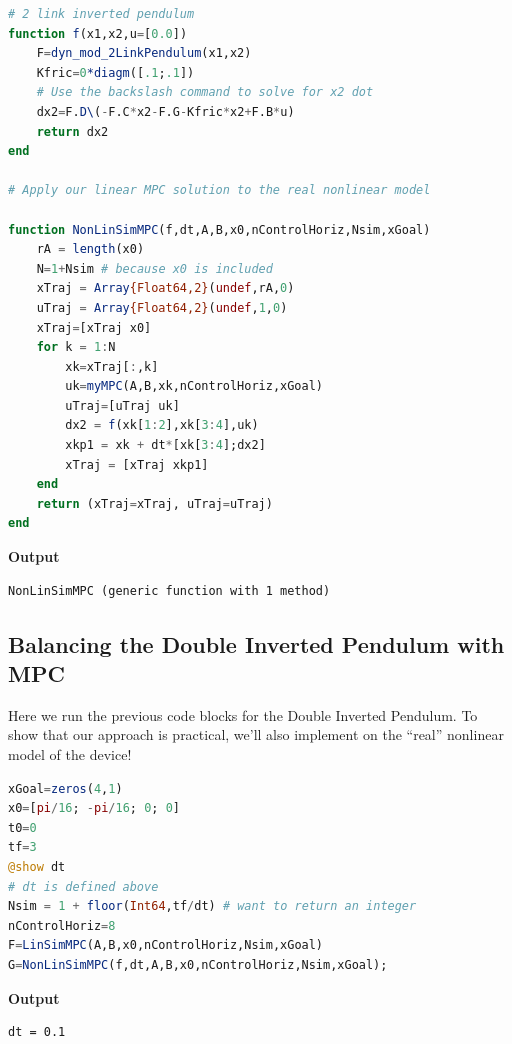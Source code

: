 \begin{lstlisting}[language=Julia,style=mystyle]
# 2 link inverted pendulum
function f(x1,x2,u=[0.0])
    F=dyn_mod_2LinkPendulum(x1,x2)
    Kfric=0*diagm([.1;.1])
    # Use the backslash command to solve for x2 dot
    dx2=F.D\(-F.C*x2-F.G-Kfric*x2+F.B*u)
    return dx2
end

# Apply our linear MPC solution to the real nonlinear model

function NonLinSimMPC(f,dt,A,B,x0,nControlHoriz,Nsim,xGoal)
    rA = length(x0)
    N=1+Nsim # because x0 is included
    xTraj = Array{Float64,2}(undef,rA,0)
    uTraj = Array{Float64,2}(undef,1,0)
    xTraj=[xTraj x0]
    for k = 1:N
        xk=xTraj[:,k]
        uk=myMPC(A,B,xk,nControlHoriz,xGoal)
        uTraj=[uTraj uk]
        dx2 = f(xk[1:2],xk[3:4],uk)
        xkp1 = xk + dt*[xk[3:4];dx2]
        xTraj = [xTraj xkp1]          
    end
    return (xTraj=xTraj, uTraj=uTraj)
end
\end{lstlisting}
\textbf{Output} 
\begin{verbatim}
NonLinSimMPC (generic function with 1 method)
\end{verbatim}

\subsection{Balancing the Double Inverted Pendulum with MPC}
 
Here we run the previous code blocks for the Double Inverted Pendulum. To show that our approach is practical, we'll also implement on the ``real'' nonlinear model of the device! \\

\begin{lstlisting}[language=Julia,style=mystyle]
xGoal=zeros(4,1)
x0=[pi/16; -pi/16; 0; 0]
t0=0
tf=3
@show dt
# dt is defined above
Nsim = 1 + floor(Int64,tf/dt) # want to return an integer
nControlHoriz=8
F=LinSimMPC(A,B,x0,nControlHoriz,Nsim,xGoal)
G=NonLinSimMPC(f,dt,A,B,x0,nControlHoriz,Nsim,xGoal);
\end{lstlisting}
\textbf{Output} 
\begin{verbatim}
dt = 0.1
\end{verbatim}


